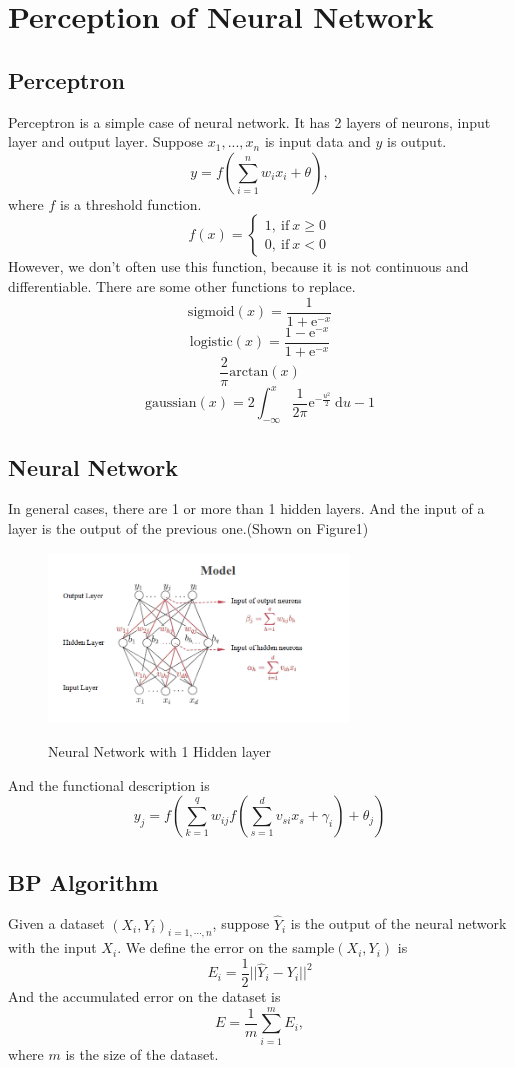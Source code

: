 \documentclass{article}
\begin{document}
\section{Perception of Neural Network}
\subsection{Perceptron}
Perceptron is a simple case of neural network. It has 2 layers of neurons, input layer and output layer.
Suppose $x_{1},...,x_{n}$ is input data and $y$ is output.
$$y=f(\sum_{i=1}^{n}w_{i}x_{i}+\theta),$$ where $f$ is a threshold function.
$$ f(x)=\left\{
\begin{aligned}
1,\ \mathrm{if}\ x\geq0 \\
0,\ \mathrm{if}\ x<0
\end{aligned}
\right.
$$
However, we don't often use this function, because it is not continuous and differentiable.
There are some other functions to replace.
$$\mathrm{sigmoid}(x)=\frac{1}{1+\mathrm{e}^{-x}}$$
$$\mathrm{logistic}(x)=\frac{1-\mathrm{e}^{-x}}{1+\mathrm{e}^{-x}}$$
$$\frac{2}{\pi}\mathrm{arctan}(x)$$
$$\mathrm{gaussian}(x)=2\int_{-\infty}^{x}\frac{1}{2\pi}\mathrm{e}^{-\frac{u^{2}}{2}}\ \mathrm{d}u-1$$
\subsection{Neural Network}
In general cases, there are 1 or more than 1 hidden layers. And the input of a layer is the output of the previous one.(Shown on Figure1)
\begin{figure}[!h]
  \centering
  \includegraphics[width=8cm]{1.png}\\
  \caption{Neural Network with 1 Hidden layer}
  \label{}
\end{figure}

And the functional description is$$y_{j}=f(\sum_{k=1}^{q}w_{ij}f(\sum_{s=1}^{d}v_{si}x_{s}+\gamma_{i})+\theta_{j})$$
\subsection{BP Algorithm}
Given a dataset ${(X_{i},Y_{i})}_{i=1,\cdots,n}$, suppose $\widehat{Y}_{i}$ is the output of the neural network with the input $X_{i}$.
We define the error on the sample$(X_{i},Y_{i})$ is$$E_{i}=\frac{1}{2}||\widehat{Y}_{i}-Y_{i}||^{2}$$
And the accumulated error on the dataset is $$E=\frac{1}{m}\sum_{i=1}^{m}E_{i},$$where $m$ is the size of the dataset.
\end{document}
